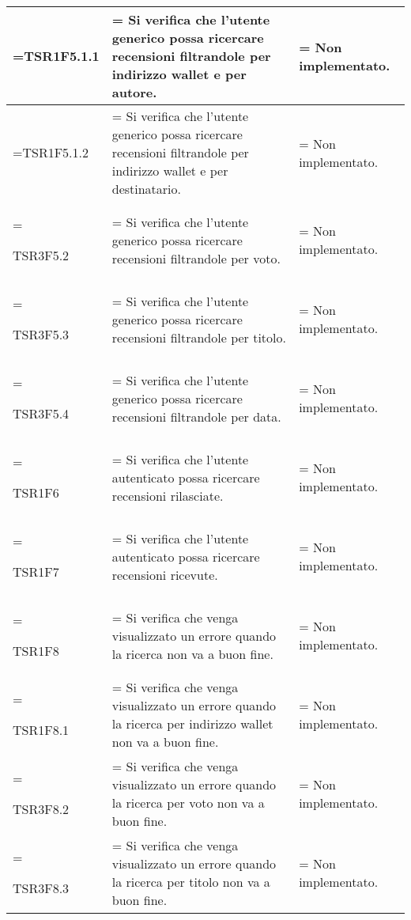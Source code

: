 \begin{xltabular}{\textwidth} {
            >{\hsize\linewidth=\hsize}X
            >{\hsize\linewidth=\hsize}X
            >{\hsize\linewidth=\hsize}X
        }
        TSR1F5.1.1&
        Si verifica che l'utente generico possa ricercare recensioni filtrandole per indirizzo wallet e per autore.&
        Non implementato.
        \\ \hline
        
        TSR1F5.1.2&
        Si verifica che l'utente generico possa ricercare recensioni filtrandole per indirizzo wallet e per destinatario.&
        Non implementato.
        \\ \hline

        TSR3F5.2&
        Si verifica che l'utente generico possa ricercare recensioni filtrandole per voto.&
        Non implementato.
        \\ \hline
        
        TSR3F5.3&
        Si verifica che l'utente generico possa ricercare recensioni filtrandole per titolo.&
        Non implementato.
        \\ \hline

        TSR3F5.4&
        Si verifica che l'utente generico possa ricercare recensioni filtrandole per data.&
        Non implementato.
        \\ \hline

        TSR1F6&
        Si verifica che l'utente autenticato possa ricercare recensioni rilasciate. &
        Non implementato.
        \\ \hline

        TSR1F7&
        Si verifica che l'utente autenticato possa ricercare recensioni ricevute. &
        Non implementato.
        \\ \hline
        
        TSR1F8&
        Si verifica che venga visualizzato un errore quando la ricerca non va a buon fine. &
        Non implementato.
        \\ \hline

        TSR1F8.1&
        Si verifica che venga visualizzato un errore quando la ricerca per indirizzo wallet non va a buon fine. &
        Non implementato.
        \\ \hline
        
        TSR3F8.2&
        Si verifica che venga visualizzato un errore quando la ricerca per voto non va a buon fine. &
        Non implementato.
        \\ \hline
        
        TSR3F8.3&
        Si verifica che venga visualizzato un errore quando la ricerca per titolo non va a buon fine. &
        Non implementato.
        \\ \hline


\end{xltabular}
